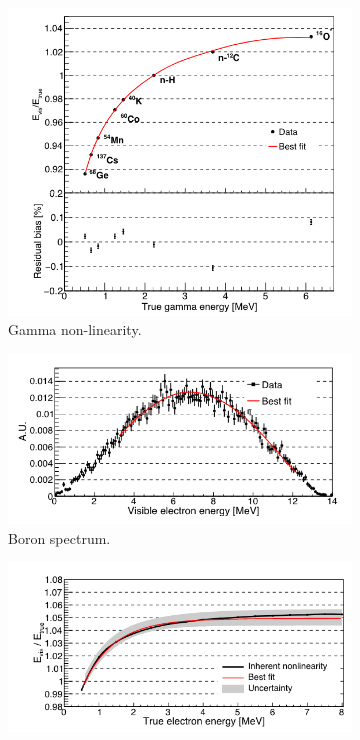 \documentclass[../main.tex]{subfiles}
\begin{document}
\begin{figure}[ht]
  \centering
  \begin{subfigure}[b]{0.24\textwidth}
    \centering
    \includegraphics[width=\textwidth]{images/juno/gamma_nl.png}
    \caption{Gamma non-linearity.}
    \label{fig:juno:nl:gamma}
  \end{subfigure}
  \begin{subfigure}[b]{0.37\textwidth}
    \centering
    \includegraphics[width=\textwidth]{images/juno/boron_nl.png}
    \caption{Boron spectrum.}
    \label{fig:juno:nl:boron}
  \end{subfigure}
  \begin{subfigure}[b]{0.37\textwidth}
    \centering
    \includegraphics[width=\textwidth]{images/juno/e-_nl.png}

\end{subfigure}
\end{figure}
\end{document}
